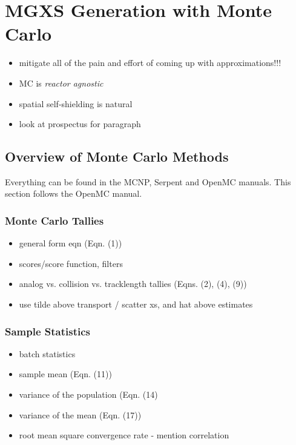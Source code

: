 \chapter{MGXS Generation with Monte Carlo}
\label{chap:mgxs-mc}

\begin{itemize}[noitemsep]
  \item mitigate all of the pain and effort of coming up with approximations!!!
  \item \ac{MC} is \emph{reactor agnostic}
  \item spatial self-shielding is natural
  \item look at prospectus for paragraph
\end{itemize}


\section{Overview of Monte Carlo Methods}
\label{sec:chap3-mc-overview}

Everything can be found in the MCNP, Serpent and OpenMC manuals. This section follows the OpenMC manual.

\subsection{Monte Carlo Tallies}
\label{subsec:chap3-mc-tallies}

\begin{itemize}[noitemsep]
  \item general form eqn (Eqn. (1))
  \item scores/score function, filters
  \item analog vs. collision vs. tracklength tallies (Eqns. (2), (4), (9))
  \item use tilde above transport / scatter xs, and hat above estimates
\end{itemize}

\subsection{Sample Statistics}
\label{subsec:chap3-mc-stats}

\begin{itemize}[noitemsep]
  \item batch statistics
  \item sample mean (Eqn. (11))
  \item variance of the population (Eqn. (14)
  \item variance of the mean (Eqn. (17))
  \item root mean square convergence rate - mention correlation
\end{itemize}



